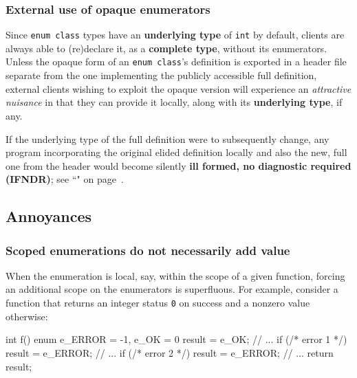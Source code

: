 \subsubsection[External use of opaque enumerators]{External use of opaque enumerators}\label{external-use-of-opaque-enumerators-enumclass}

Since \texttt{enum}~\texttt{class} types have an \textbf{underlying
type} of \texttt{int} by default, clients are always able to (re)declare
it, as a \textbf{complete type}, without its enumerators. Unless the
opaque form of an \texttt{enum}~\texttt{class}'s definition is exported
in a header file separate from the one implementing the publicly
accessible full definition, external clients wishing to exploit the
opaque version will experience an \emph{attractive nuisance} in that
they can provide it locally, along with its \textbf{underlying type}, if
any.

If the underlying type of the full definition were to subsequently
change, any program incorporating the original elided definition locally
and also the new, full one from the header would become silently \textbf{ill formed, no diagnostic required (IFNDR)}; see ``" on page~\pageref{enumopaque}.

\subsection[Annoyances]{Annoyances}\label{annoyances-enumclass}

\subsubsection[Scoped enumerations do not necessarily add value]{Scoped enumerations do not necessarily add value}\label{scoped-enumerations-do-not-necessarily-add-value}

When the enumeration is local, say, within the scope of a given
function, forcing an additional scope on the enumerators is superfluous.
For example, consider a function that returns an integer status
\texttt{0} on success and a nonzero value otherwise:

\begin{emcppslisting}
int f()
{
    enum { e_ERROR = -1, e_OK = 0 } result = e_OK;
    // ...
    if (/* error 1 */) { result = e_ERROR; }
    // ...
    if (/* error 2 */) { result = e_ERROR; }
    // ...
    return result;
}
\end{emcppslisting}

